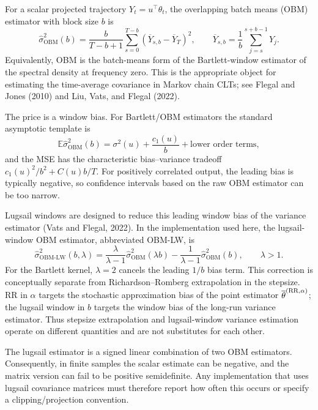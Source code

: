 For a scalar projected trajectory $Y_t=u^\top\theta_t$, the overlapping batch
means (OBM) estimator with block size $b$ is
\begin{equation}\label{eq:obm-experimental-estimator}
\widehat\sigma_{\operatorname{OBM}}^2(b)
  =\frac{b}{T-b+1}\sum_{s=0}^{T-b}
      \left(\overline Y_{s,b}-\overline Y_T\right)^2,
\qquad
\overline Y_{s,b}=\frac1b\sum_{j=s}^{s+b-1}Y_j.
\end{equation}
Equivalently, OBM is the batch-means form of the Bartlett-window estimator of
the spectral density at frequency zero. This is the appropriate object for
estimating the time-average covariance in Markov chain CLTs; see Flegal and
Jones (2010) and Liu, Vats, and Flegal (2022).

The price is a window bias. For Bartlett/OBM estimators the standard
asymptotic template is
\begin{equation}\label{eq:obm-bias-template}
\mathbb E\widehat\sigma_{\operatorname{OBM}}^2(b)
  =\sigma^2(u)+\frac{c_1(u)}b+\text{lower order terms},
\end{equation}
and the MSE has the characteristic bias--variance tradeoff
$c_1(u)^2/b^2+C(u)b/T$. For positively correlated output, the leading bias is
typically negative, so confidence intervals based on the raw OBM estimator
can be too narrow.

Lugsail windows are designed to reduce this leading window bias of the
variance estimator (Vats and Flegal, 2022). In the implementation used here,
the lugsail-window OBM estimator, abbreviated OBM-LW, is
\begin{equation}\label{eq:obm-lw-estimator}
\widehat\sigma_{\operatorname{OBM-LW}}^2(b,\lambda)
  =\frac{\lambda}{\lambda-1}\widehat\sigma_{\operatorname{OBM}}^2(\lambda b)
   -\frac1{\lambda-1}\widehat\sigma_{\operatorname{OBM}}^2(b),
\qquad \lambda>1.
\end{equation}
For the Bartlett kernel, $\lambda=2$ cancels the leading $1/b$ bias term.
This correction is conceptually separate from Richardson--Romberg
extrapolation in the stepsize. RR in $\alpha$ targets the stochastic
approximation bias of the point estimator $\overline\theta^{(\mathrm{RR},\alpha)}$;
the lugsail window in $b$ targets the window bias of the long-run variance
estimator. Thus stepsize extrapolation and lugsail-window variance estimation
operate on different quantities and are not substitutes for each other.

The lugsail estimator is a signed linear combination of two OBM estimators.
Consequently, in finite samples the scalar estimate can be negative, and the
matrix version can fail to be positive semidefinite. Any implementation that
uses lugsail covariance matrices must therefore report how often this occurs
or specify a clipping/projection convention.

